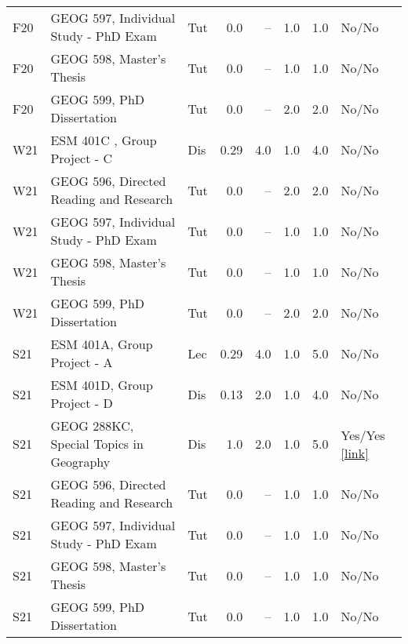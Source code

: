 \begin{longtable}{p{1cm}p{7cm}p{0.75cm}rrrrp{2.5cm}}
F20 & GEOG 597, Individual Study - PhD Exam & Tut & 0.0 & -- & 1.0 & 1.0 & No/No    \\ 
F20 & GEOG 598, Master’s Thesis & Tut & 0.0 & -- & 1.0 & 1.0 & No/No    \\ 
F20 & GEOG 599, PhD Dissertation & Tut & 0.0 & -- & 2.0 & 2.0 & No/No    \\ 
W21 & ESM 401C , Group Project - C & Dis & 0.29 & 4.0 & 1.0 & 4.0 & No/No    \\ 
W21 & GEOG 596, Directed Reading and Research & Tut & 0.0 & -- & 2.0 & 2.0 & No/No    \\ 
W21 & GEOG 597, Individual Study - PhD Exam & Tut & 0.0 & -- & 1.0 & 1.0 & No/No    \\ 
W21 & GEOG 598, Master’s Thesis & Tut & 0.0 & -- & 1.0 & 1.0 & No/No    \\ 
W21 & GEOG 599, PhD Dissertation & Tut & 0.0 & -- & 2.0 & 2.0 & No/No    \\ 
S21 & ESM 401A, Group Project - A & Lec & 0.29 & 4.0 & 1.0 & 5.0 & No/No    \\ 
S21 & ESM 401D, Group Project - D & Dis & 0.13 & 2.0 & 1.0 & 4.0 & No/No    \\ 
S21 & GEOG 288KC, Special Topics in Geography & Dis & 1.0 & 2.0 & 1.0 & 5.0 & Yes/Yes  \href{https://ucsb.box.com/s/wkdexakrybpri16xk2gu5860so2ae0xa}{[link]}  \\ 
S21 & GEOG 596, Directed Reading and Research & Tut & 0.0 & -- & 1.0 & 1.0 & No/No    \\ 
S21 & GEOG 597, Individual Study - PhD Exam & Tut & 0.0 & -- & 1.0 & 1.0 & No/No    \\ 
S21 & GEOG 598, Master’s Thesis & Tut & 0.0 & -- & 1.0 & 1.0 & No/No    \\ 
S21 & GEOG 599, PhD Dissertation & Tut & 0.0 & -- & 1.0 & 1.0 & No/No    \\ 
 
\end{longtable}
